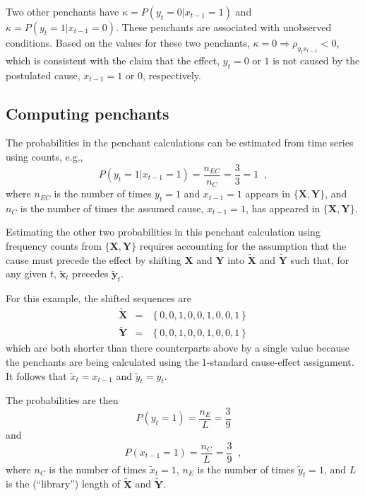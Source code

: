 \documentclass[twocolumn,aps,pre,groupedaddress]{revtex4-1}
\begin{document}
Two other penchants have $\kappa = P\left( y_t = 0 | x_{t-1} = 1\right)$ and $\kappa = P\left( y_t = 1 | x_{t-1} = 0\right)$.  These penchants are associated with unobserved conditions.  Based on the values for these two penchants, $\kappa=0\Rightarrow \rho_{y_{t}x_{t-1}} < 0$, which is consistent with the claim that the effect, $y_t = 0$ or $1$ is not caused by the postulated cause, $x_{t-1} = 1$ or $0$, respectively.  


\subsection{Computing penchants}
The probabilities in the penchant calculations can be estimated from time series using counts, e.g.,\
$$
P\left( y_t = 1 | x_{t-1} = 1\right) = \frac{n_{EC}}{n_C} = \frac{3}{3} = 1\;\;,
$$
where $n_{EC}$ is the number of times $y_t=1$ and $x_{t-1}=1$ appears in $\{\mathbf{X},\mathbf{Y}\}$, and $n_{C}$ is the number of times the assumed cause, $x_{t-1}=1$, has appeared in $\{\mathbf{X},\mathbf{Y}\}$.  

Estimating the other two probabilities in this penchant calculation using frequency counts from $\{\mathbf{X},\mathbf{Y}\}$ requires accounting for the assumption that the cause must precede the effect by shifting $\mathbf{X}$ and $\mathbf{Y}$ into $\tilde{\mathbf{X}}$ and $\tilde{\mathbf{Y}}$ such that, for any given $t$, $\tilde{\mathbf{x}}_t$ precedes $\tilde{\mathbf{y}}_t$.

For this example, the shifted sequences are
\begin{eqnarray*}
\tilde{\mathbf{X}} &=& \left\{0,0,1,0,0,1,0,0,1\right\}\\
\tilde{\mathbf{Y}} &=& \left\{0,0,1,0,0,1,0,0,1\right\}
\end{eqnarray*}
which are both shorter than there counterparts above by a single value because the penchants are being calculated using the 1-standard cause-effect assignment. It follows that $\tilde{x}_t = x_{t-1}$ and $\tilde{y}_t=y_t$.  

The probabilities are then
\begin{equation}
P\left( y_t = 1\right) = \frac{n_E}{L} = \frac{3}{9}
\end{equation}
and
\begin{equation}
P\left( x_{t-1} = 1\right) = \frac{n_C}{L} = \frac{3}{9}\;\;,
\end{equation}
where $n_C$ is the number of times $\tilde{x}_t = 1$, $n_E$ is the number of times $\tilde{y}_t = 1$, and $L$ is the (``library'') length of $\tilde{\mathbf{X}}$ and $\tilde{\mathbf{Y}}$.  
\end{document}
